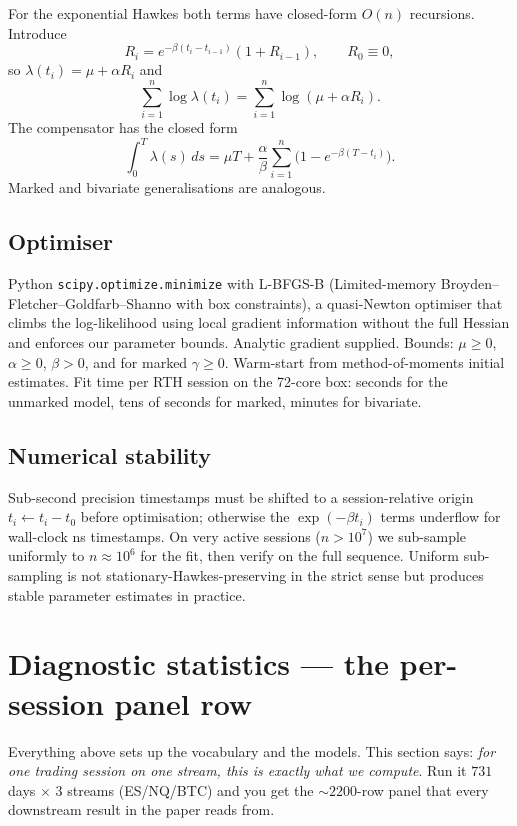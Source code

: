 For the exponential Hawkes both terms have closed-form $O(n)$ recursions. Introduce
$$R_i = e^{-\beta(t_i - t_{i-1})}(1 + R_{i-1}), \qquad R_0 \equiv 0,$$
so $\lambda(t_i) = \mu + \alpha R_i$ and
$$\sum_{i=1}^n \log \lambda(t_i) = \sum_{i=1}^n \log(\mu + \alpha R_i).$$
The compensator has the closed form
$$\int_0^T \lambda(s)\, ds = \mu T + \frac{\alpha}{\beta}\sum_{i=1}^n\!\big(1 - e^{-\beta(T - t_i)}\big).$$
Marked and bivariate generalisations are analogous.

\subsection{Optimiser}
\label{app:mle-opt}

Python \texttt{scipy.optimize.minimize} with L-BFGS-B (Limited-memory Broyden--Fletcher--Goldfarb--Shanno with box constraints), a quasi-Newton optimiser that climbs the log-likelihood using local gradient information without the full Hessian and enforces our parameter bounds. Analytic gradient supplied. Bounds: $\mu \geq 0$, $\alpha \geq 0$, $\beta > 0$, and for marked $\gamma \geq 0$. Warm-start from method-of-moments initial estimates. Fit time per RTH session on the 72-core box: seconds for the unmarked model, tens of seconds for marked, minutes for bivariate.

\subsection{Numerical stability}
\label{app:mle-stab}

Sub-second precision timestamps must be shifted to a session-relative origin $t_i \leftarrow t_i - t_0$ before optimisation; otherwise the $\exp(-\beta t_i)$ terms underflow for wall-clock ns timestamps. On very active sessions ($n > 10^7$) we sub-sample uniformly to $n \approx 10^6$ for the fit, then verify on the full sequence. Uniform sub-sampling is not stationary-Hawkes-preserving in the strict sense but produces stable parameter estimates in practice.

\section{Diagnostic statistics --- the per-session panel row}
\label{app:diag}

Everything above sets up the vocabulary and the models. This section says: \emph{for one trading session on one stream, this is exactly what we compute}. Run it $731$ days $\times$ $3$ streams (ES/NQ/BTC) and you get the $\sim 2200$-row panel that every downstream result in the paper reads from.

